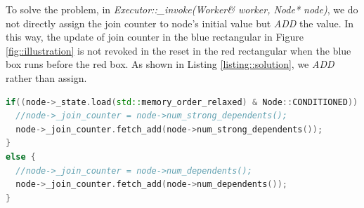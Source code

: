 \documentclass[11pt,twoside]{article}
\theoremstyle{plain}
\theoremstyle{definition}
\theoremstyle{remark}
\begin{document}
To solve the problem,
in \textit{Executor::\_invoke(Worker\& worker, Node* node)},
we do not directly assign the join counter to node's initial value but
\textit{ADD} the value.
In this way,
the update of join counter in the blue rectangular in Figure \ref{fig::illustration}
is not revoked in the reset in the red rectangular
when the blue box runs before the red box.
As shown in Listing \ref{listing::solution},
we \textit{ADD} rather than assign.
 

\begin{lstlisting}[language=C++,label=listing::solution,caption={Solution to the bug.}]
if((node->_state.load(std::memory_order_relaxed) & Node::CONDITIONED)) {
  //node->_join_counter = node->num_strong_dependents();
  node->_join_counter.fetch_add(node->num_strong_dependents());
}
else {
  //node->_join_counter = node->num_dependents();
  node->_join_counter.fetch_add(node->num_dependents());
}
\end{lstlisting}
\end{document}
